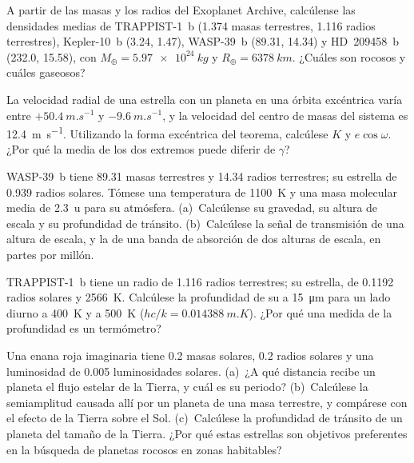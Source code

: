 \begin{exercise}[$\star\star$]\label{exo:b3:exoplanets:6}
A partir de las masas y los radios del Exoplanet Archive, calcúlense las
densidades medias de TRAPPIST-1~b (1.374 masas terrestres, 1.116 radios
terrestres), Kepler-10~b (3.24, 1.47), WASP-39~b (89.31, 14.34) y HD~209458~b (232.0,
15.58), con $M_\oplus = \qty{5.97e24}{kg}$ y $R_\oplus =
\qty{6378}{km}$. ¿Cuáles son rocosos y cuáles gaseosos?
\end{exercise}

\begin{exercise}[$\star\star$]\label{exo:b3:exoplanets:7}
La velocidad radial de una estrella con un planeta en una órbita excéntrica
varía entre $+\qty{50.4}{m.s^{-1}}$ y $-\qty{9.6}{m.s^{-1}}$, y la velocidad del
centro de masas del sistema es \qty{12.4}{m.s^{-1}}. Utilizando la forma
excéntrica del teorema, calcúlese $K$ y $e\cos\omega$. ¿Por qué la media de los
dos extremos puede diferir de $\gamma$?
\end{exercise}

\begin{exercise}[$\star\star$]\label{exo:b3:exoplanets:8}
WASP-39~b tiene 89.31 masas terrestres y 14.34 radios terrestres; su estrella de
0.939 radios solares. Tómese una temperatura de \qty{1100}{K} y una
masa molecular media de \qty{2.3}{u} para su atmósfera. (a)~Calcúlense su gravedad,
su altura de escala y su profundidad de tránsito. (b)~Calcúlese la señal de
transmisión de una altura de escala, y la de una banda de absorción de dos
alturas de escala, en partes por millón.
\end{exercise}

\begin{exercise}[$\star\star$]\label{exo:b3:exoplanets:9}
TRAPPIST-1~b tiene un radio de 1.116 radios terrestres; su estrella, de 0.1192
radios solares y \qty{2566}{K}. Calcúlese la profundidad de su  a
\qty{15}{\micro m} para un lado diurno a \qty{400}{K} y a \qty{500}{K}
($hc/k = \qty{0.014388}{m.K}$). ¿Por qué una medida de la profundidad
es un termómetro?
\end{exercise}

\begin{exercise}[$\star\star\star$]\label{exo:b3:exoplanets:10}
Una enana roja imaginaria tiene 0.2 masas solares, 0.2 radios solares y una
luminosidad de \num{0.005} luminosidades solares. (a)~¿A qué distancia recibe un
planeta el flujo estelar de la Tierra, y cuál es su periodo?
(b)~Calcúlese la semiamplitud causada allí por un planeta de una masa terrestre,
y compárese con el efecto de la Tierra sobre el Sol. (c)~Calcúlese la
profundidad de tránsito de un planeta del tamaño de la Tierra. ¿Por qué estas
estrellas son objetivos preferentes en la búsqueda de planetas rocosos en zonas habitables?
\end{exercise}

